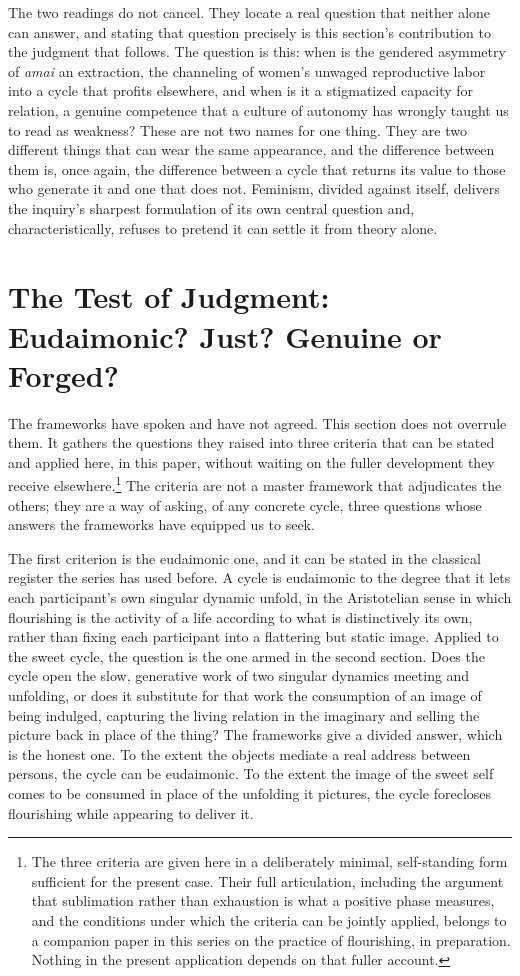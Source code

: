 \documentclass[11pt,a4paper]{article}
\begin{document}
The two readings do not cancel. They locate a real question that neither alone can answer, and stating that question precisely is this section's contribution to the judgment that follows. The question is this: when is the gendered asymmetry of \textit{amai} an extraction, the channeling of women's unwaged reproductive labor into a cycle that profits elsewhere, and when is it a stigmatized capacity for relation, a genuine competence that a culture of autonomy has wrongly taught us to read as weakness? These are not two names for one thing. They are two different things that can wear the same appearance, and the difference between them is, once again, the difference between a cycle that returns its value to those who generate it and one that does not. Feminism, divided against itself, delivers the inquiry's sharpest formulation of its own central question and, characteristically, refuses to pretend it can settle it from theory alone.

\section{The Test of Judgment: Eudaimonic? Just? Genuine or Forged?}

The frameworks have spoken and have not agreed. This section does not overrule them. It gathers the questions they raised into three criteria that can be stated and applied here, in this paper, without waiting on the fuller development they receive elsewhere.\footnote{The three criteria are given here in a deliberately minimal, self-standing form sufficient for the present case. Their full articulation, including the argument that sublimation rather than exhaustion is what a positive phase measures, and the conditions under which the criteria can be jointly applied, belongs to a companion paper in this series on the practice of flourishing, in preparation. Nothing in the present application depends on that fuller account.} The criteria are not a master framework that adjudicates the others; they are a way of asking, of any concrete cycle, three questions whose answers the frameworks have equipped us to seek.

The first criterion is the eudaimonic one, and it can be stated in the classical register the series has used before. A cycle is eudaimonic to the degree that it lets each participant's own singular dynamic unfold, in the Aristotelian sense in which flourishing is the activity of a life according to what is distinctively its own, rather than fixing each participant into a flattering but static image. Applied to the sweet cycle, the question is the one armed in the second section. Does the cycle open the slow, generative work of two singular dynamics meeting and unfolding, or does it substitute for that work the consumption of an image of being indulged, capturing the living relation in the imaginary and selling the picture back in place of the thing? The frameworks give a divided answer, which is the honest one. To the extent the objects mediate a real address between persons, the cycle can be eudaimonic. To the extent the image of the sweet self comes to be consumed in place of the unfolding it pictures, the cycle forecloses flourishing while appearing to deliver it.
\end{document}
